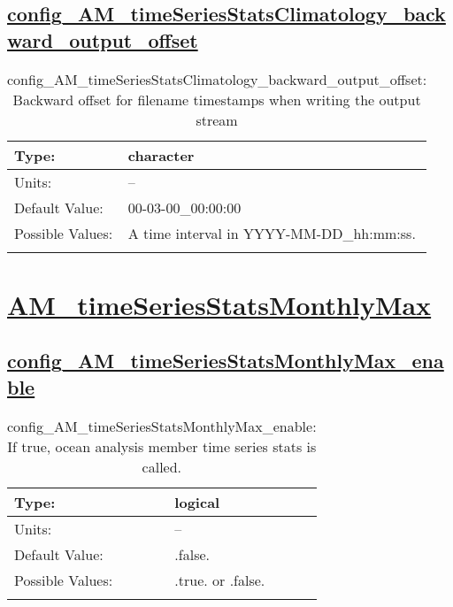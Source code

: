 \subsection[config\_AM\_timeSeriesStatsClimatology\_backward\_output\_offset]{\hyperref[sec:nm_tab_AM_timeSeriesStatsClimatology]{config\_AM\_timeSeriesStatsClimatology\_backward\_output\_offset}}
\label{subsec:nm_sec_config_AM_timeSeriesStatsClimatology_backward_output_offset}
\begin{center}
\begin{longtable}{| p{2.0in} || p{4.0in} |}
    \hline
    Type: & character \\
    \hline
    Units: & -- \\
    \hline
    Default Value: & 00-03-00\_00:00:00 \\
    \hline
    Possible Values: & A time interval in YYYY-MM-DD\_hh:mm:ss. \\
    \hline
    \caption{config\_AM\_timeSeriesStatsClimatology\_backward\_output\_offset: Backward offset for filename timestamps when writing the output stream}
\end{longtable}
\end{center}
\section[AM\_timeSeriesStatsMonthlyMax]{\hyperref[sec:nm_tab_AM_timeSeriesStatsMonthlyMax]{AM\_timeSeriesStatsMonthlyMax}}
\label{sec:nm_sec_AM_timeSeriesStatsMonthlyMax}
\subsection[config\_AM\_timeSeriesStatsMonthlyMax\_enable]{\hyperref[sec:nm_tab_AM_timeSeriesStatsMonthlyMax]{config\_AM\_timeSeriesStatsMonthlyMax\_enable}}
\label{subsec:nm_sec_config_AM_timeSeriesStatsMonthlyMax_enable}
\begin{center}
\begin{longtable}{| p{2.0in} || p{4.0in} |}
    \hline
    Type: & logical \\
    \hline
    Units: & -- \\
    \hline
    Default Value: & .false. \\
    \hline
    Possible Values: & .true. or .false. \\
    \hline
    \caption{config\_AM\_timeSeriesStatsMonthlyMax\_enable: If true, ocean analysis member time series stats is called.}
\end{longtable}
\end{center}
